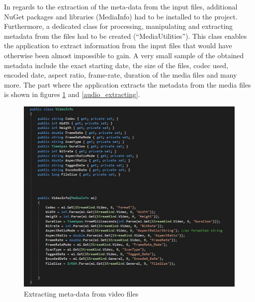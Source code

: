 In regards to the extraction of the meta-data from the input files, additional NuGet packages and libraries (MediaInfo) had to be installed to the project. Furthermore, a dedicated class for processing, manipulating and extracting metadata from the files had to be created (``MediaUtilities''). This class enables the application to extract information from the input files that would have otherwise been almost impossible to gain. A very small sample of the obtained metadata include the exact starting date, the size of the files, codec used, encoded date, aspect ratio, frame-rate, duration of the media files and many more. The part where the application extracts the metadata from the media files is shown in figures \ref{video_extracting} and \ref{audio_extracting}.


\begin{figure}[!ht]
\begin{center}
\includegraphics[width=17cm]{imgs/video_extracting.jpg}
\end{center}\vspace{-0.3cm}
\caption[Extracting meta-data from video files]{Extracting meta-data from video files} \label{video_extracting}
\end{figure}


